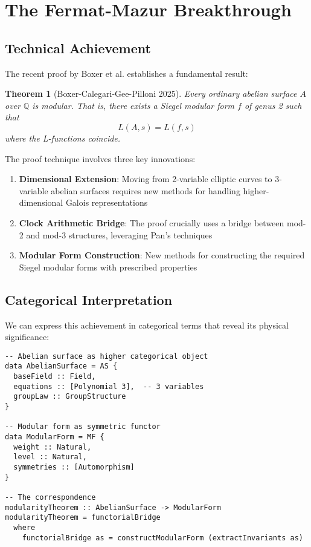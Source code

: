 \documentclass[12pt,a4paper]{article}
\newtheorem{theorem}{Theorem}[section]
\begin{document}
\section{The Fermat-Mazur Breakthrough}

\subsection{Technical Achievement}

The recent proof by Boxer et al. establishes a fundamental result:

\begin{theorem}[Boxer-Calegari-Gee-Pilloni 2025]
Every ordinary abelian surface $A$ over $\mathbb{Q}$ is modular. That is, there exists a Siegel modular form $f$ of genus 2 such that
\[
L(A, s) = L(f, s)
\]
where the L-functions coincide.
\end{theorem}

The proof technique involves three key innovations:

\begin{enumerate}
\item \textbf{Dimensional Extension}: Moving from 2-variable elliptic curves to 3-variable abelian surfaces requires new methods for handling higher-dimensional Galois representations
\item \textbf{Clock Arithmetic Bridge}: The proof crucially uses a bridge between mod-2 and mod-3 structures, leveraging Pan's techniques \cite{Pan2020}
\item \textbf{Modular Form Construction}: New methods for constructing the required Siegel modular forms with prescribed properties
\end{enumerate}

\subsection{Categorical Interpretation}

We can express this achievement in categorical terms that reveal its physical significance:

\begin{lstlisting}[style=haskell]
-- Abelian surface as higher categorical object
data AbelianSurface = AS {
  baseField :: Field,
  equations :: [Polynomial 3],  -- 3 variables
  groupLaw :: GroupStructure
}

-- Modular form as symmetric functor
data ModularForm = MF {
  weight :: Natural,
  level :: Natural,
  symmetries :: [Automorphism]
}

-- The correspondence
modularityTheorem :: AbelianSurface -> ModularForm
modularityTheorem = functorialBridge
  where
    functorialBridge as = constructModularForm (extractInvariants as)
\end{lstlisting}
\end{document}
